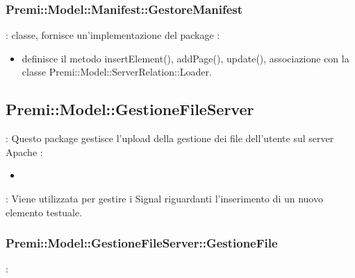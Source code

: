	\subsubsection{Premi::Model::Manifest::GestoreManifest}{
		\textbf{\tipo}: classe, fornisce un'implementazione del package
		\textbf{\relaz}:
		\begin{itemize}
			\item definisce il metodo insertElement(), addPage(), update(), associazione con la classe Premi::Model::ServerRelation::Loader.
		\end{itemize}
        }

\subsection{Premi::Model::GestioneFileServer} {
   	\textbf{\tipo}: Questo package gestisce l'upload della gestione dei file dell'utente sul server Apache
   	\textbf{\relaz}:
   	\begin{itemize}
   		\item 
   	\end{itemize}
   	\textbf{\interfacce}: Viene utilizzata per gestire i Signal riguardanti l’inserimento di un nuovo elemento testuale.\\
	}
	\subsubsection{Premi::Model::GestioneFileServer::GestioneFile}{
		\textbf{\tipo}: 
	}

	
